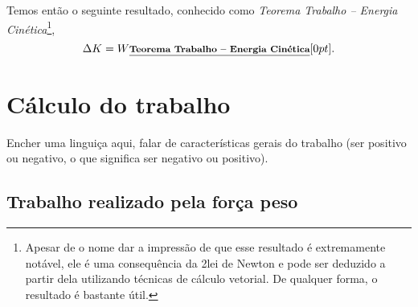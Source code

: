 Temos então o seguinte resultado, conhecido como \emph{Teorema Trabalho -- Energia Cinética}\footnote[][15mm]{Apesar de o nome dar a impressão de que esse resultado é extremamente notável, ele é uma consequência da 2\textordfeminine lei de Newton e pode ser deduzido a partir dela utilizando técnicas de cálculo vetorial. De qualquer forma, o resultado é bastante útil.},
\begin{equation}
  \Delta K = W \relax{\footnotesize\emph{\textbf{Teorema Trabalho -- Energia Cinética}}}[0pt].
\end{equation}

\section{Cálculo do trabalho}

Encher uma linguiça aqui, falar de características gerais do trabalho (ser positivo ou negativo, o que significa ser negativo ou positivo).

\subsection{Trabalho realizado pela força peso}

